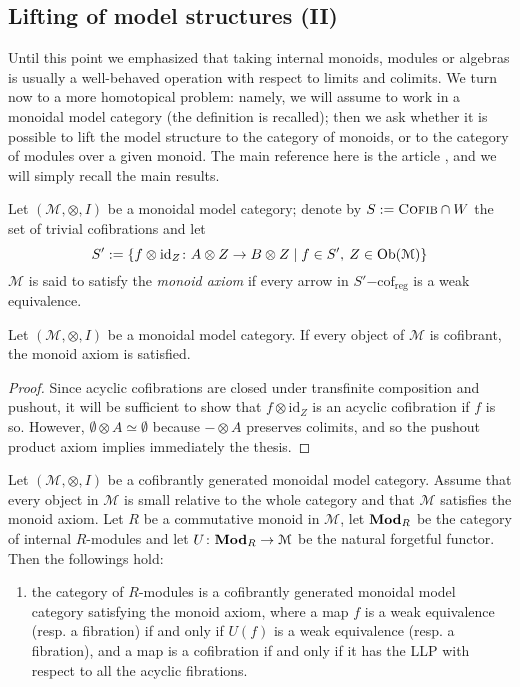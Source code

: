 \begin{refsection}
\subsection{Lifting of model structures (II)}

Until this point we emphasized that taking internal monoids, modules or algebras is usually a well-behaved operation with respect to limits and colimits. We turn now to a more homotopical problem: namely, we will assume to work in a monoidal model category (the definition is recalled); then we ask whether it is possible to lift the model structure to the category of monoids, or to the category of modules over a given monoid. The main reference here is the article \cite{schwede}, and we will simply recall the main results.

\begin{defin}
Let $(\mathcal M, \otimes, I)$ be a monoidal model category; denote by $S := \textsc{Cofib} \cap W$ the set of trivial cofibrations and let
\[
S' := \{f \otimes \mathrm{id}_Z \colon A \otimes Z \to B \otimes Z \mid f \in S', \: Z \in \operatorname{Ob}(\mathcal M)\}
\]
$\mathcal M$ is said to satisfy the \emph{monoid axiom} if every arrow in $S'\mathrm{-cof}_{\mathrm{reg}}$ is a weak equivalence.
\end{defin}

\begin{lemma}
Let $(\mathcal M, \otimes, I)$ be a monoidal model category. If every object of $\mathcal M$ is cofibrant, the monoid axiom is satisfied.
\end{lemma}

\begin{proof}
Since acyclic cofibrations are closed under transfinite composition and pushout, it will be sufficient to show that $f \otimes \mathrm{id}_Z$ is an acyclic cofibration if $f$ is so. However, $\emptyset \otimes A \simeq \emptyset$ because $- \otimes A$ preserves colimits, and so the pushout product axiom implies immediately the thesis.
\end{proof}

\begin{thm} \label{thm lifting II}
Let $(\mathcal M, \otimes, I)$ be a cofibrantly generated monoidal model category. Assume that every object in $\mathcal M$ is small relative to the whole category and that $\mathcal M$ satisfies the monoid axiom. Let $R$ be a commutative monoid in $\mathcal M$, let $\mathbf{Mod}_R$ be the category of internal $R$-modules and let $U \colon \mathbf{Mod}_R \to \mathcal M$ be the natural forgetful functor. Then the followings hold:
\begin{enumerate}
\item the category of $R$-modules is a cofibrantly generated monoidal model category satisfying the monoid axiom, where a map $f$ is a weak equivalence (resp. a fibration) if and only if $U(f)$ is a weak equivalence (resp. a fibration), and a map is a cofibration if and only if it has the LLP with respect to all the acyclic fibrations.


\end{enumerate}
\end{thm}
\end{refsection}
